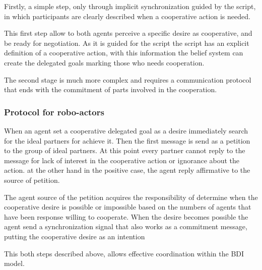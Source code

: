 Firstly, a simple step, only through implicit synchronization guided by the script, in which participants are clearly described when a cooperative action is needed.

This first step allow to both agents perceive a specific desire as cooperative, and be ready for negotiation. As it is guided for the script the script has an explicit definition of a cooperative action, with this information the belief system can create the delegated goals marking those who needs cooperation.


The second stage is much more complex and requires a communication protocol that ends with the commitment of parts involved in the cooperation. 

\subsubsection{Protocol for robo-actors}

When an agent set a cooperative delegated goal as a desire immediately search for the ideal partners for achieve it. Then the first message is send  as a petition to the group of ideal partners. At this point every partner cannot reply to the message for lack of interest in the cooperative action or ignorance about the action. at the other hand in the positive case, the agent reply affirmative to the source of petition.

The agent source of the petition acquires the responsibility of determine when the cooperative desire is possible or impossible based on the numbers of agents that have been response willing to cooperate. When the desire becomes possible the agent send a synchronization signal that also works as a commitment message, putting the cooperative desire as an intention

This both steps described above, allows effective coordination within the BDI model. 